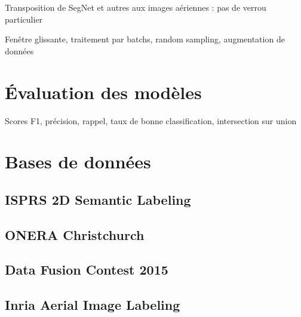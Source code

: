 Transposition de SegNet et autres aux images aériennes : pas de verrou particulier

Fenêtre glissante, traitement par batchs, random sampling, augmentation de données

\section{Évaluation des modèles}

Scores F1, précision, rappel, taux de bonne classification, intersection sur union

\section{Bases de données}

\subsection{ISPRS 2D Semantic Labeling}

\subsection{ONERA Christchurch}

\subsection{Data Fusion Contest 2015}

\subsection{Inria Aerial Image Labeling}
	


